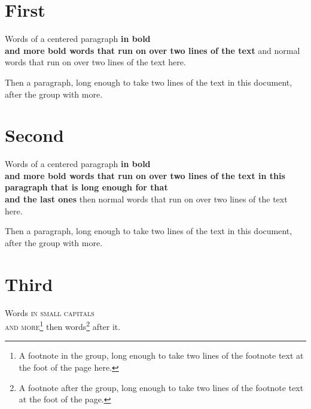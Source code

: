 \documentclass{article}
\begin{document}
\section{First}
{\centering Words of a centered paragraph \textbf{in bold \\ and more bold words that run on over two lines of the text} and normal words that run on over two lines of the text here.\par}

Then a paragraph, long enough to take two lines of the text in this document, after the group with more.

\section{Second}
{\centering Words of a centered paragraph \textbf{in bold \\ and more bold words that run on over two lines of the text in this paragraph that is long enough for that \\ and the last ones} then normal words that run on over two lines of the text here.\par}

Then a paragraph, long enough to take two lines of the text in this document, after the group with more.

\section{Third}
{\centering Words \textsc{in small capitals \\ and more\footnote{A footnote in the group, long enough to take two lines of the footnote text at the foot of the page here.}} then words\footnote{A footnote after the group, long enough to take two lines of the footnote text at the foot of the page.} after it.\par}
\end{document}
